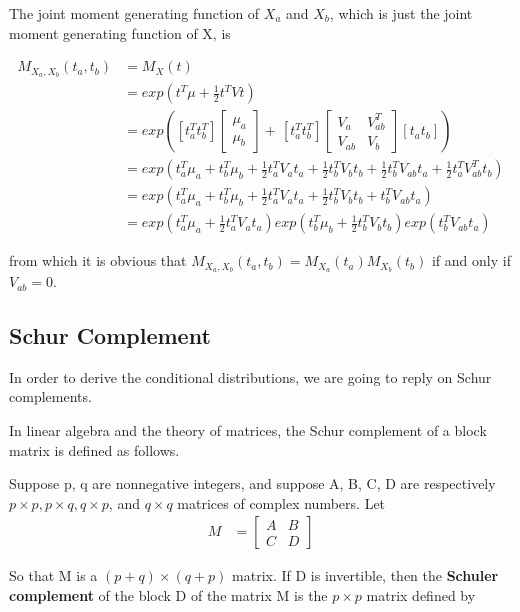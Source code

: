 \documentclass[11pt]{article} %
\begin{document}
The joint moment generating function of $X_a$ and $X_b$, which is just the joint moment generating function of X, is

\begin{align*}
	M_{X_a, X_b}(t_a, t_b) &= M_{X}(t) \\
	&= exp(t^T \mu + \frac{1}{2} t^T V t) \\
	&= exp \left( [t_a^T t_b^T] \begin{bmatrix}
		\mu_a \\
		\mu_b
	\end{bmatrix} + \frac{}{} [t_a^T t_b^T] \begin{bmatrix}
	V_a & V_{ab}^T \\
	V_{ab} & V_b
\end{bmatrix} [t_a t_b] \right) \\
&= exp \left( t_a^T \mu_a + t_b^T \mu_b + \frac{1}{2} t_a^T V_a t_a + \frac{1}{2} t_b^T V_b t_b + \frac{1}{2} t_b^T V_{ab} t_a + \frac{1}{2} t_a^T V_{ab}^T t_b \right) \\
&= exp \left( t_a^T \mu_a + t_b^T \mu_b + \frac{1}{2} t_a^T V_a t_a + \frac{1}{2} t_b^T V_b t_b +  t_b^T V_{ab} t_a  \right) \\
&= exp \left( t_a^T \mu_a + \frac{1}{2} t_a^T V_a t_a \right) exp \left( t_b^T \mu_b + \frac{1}{2} t_b^T V_b t_b \right) exp( t_b^T V_{ab} t_a)
\end{align*}

from which it is obvious that $M_{X_a, X_b}(t_a, t_b) = M_{X_a}(t_a) M_{X_b}(t_b)$ if and only if $V_{ab} = 0$.

\subsection{Schur Complement}
In order to derive the conditional distributions, we are going to reply on Schur complements. 

In linear algebra and the theory of matrices, the Schur complement of a block matrix is defined as follows.

Suppose p, q are nonnegative integers, and suppose A, B, C, D are respectively $p \times p, p \times q, q \times p$, and $q \times q$ matrices of complex numbers. Let
\begin{align*}
M &= \begin{bmatrix}
	A & B \\
	C & D
\end{bmatrix}
\end{align*}

So that M is a $(p+q) \times (q + p)$ matrix. If D is invertible, then the \textbf{ Schuler complement
} of the block D of the matrix M is the $p \times p$ matrix defined by 
\end{document}
